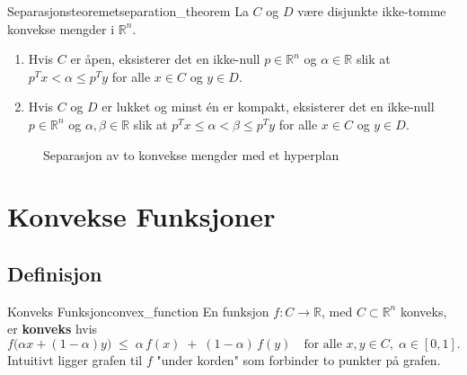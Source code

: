 \begin{theorem}{Separasjonsteoremet}{separation_theorem}
    La $C$ og $D$ være disjunkte ikke-tomme konvekse mengder i $\mathbb{R}^n$.
    \begin{enumerate}
        \item Hvis $C$ er åpen, eksisterer det en ikke-null $p \in \mathbb{R}^n$ og $\alpha \in \mathbb{R}$ slik at $p^T x < \alpha \leq p^T y$ for alle $x \in C$ og $y \in D$.
        \item Hvis $C$ og $D$ er lukket og minst én er kompakt, eksisterer det en ikke-null $p \in \mathbb{R}^n$ og $\alpha, \beta \in \mathbb{R}$ slik at $p^T x \leq \alpha < \beta \leq p^T y$ for alle $x \in C$ og $y \in D$.
    \end{enumerate}
\end{theorem}

\begin{figure}[htb]
    \centering
    \caption{Separasjon av to konvekse mengder med et hyperplan}
    \label{fig:separation}
\end{figure}

\section{Konvekse Funksjoner}

\subsection{Definisjon}
\begin{definition}{Konveks Funksjon}{convex_function}
    En funksjon $f: C \to \mathbb{R}$, med $C \subset \mathbb{R}^n$ konveks, er \textbf{konveks} hvis
    \[
    f\bigl(\alpha x + (1-\alpha) y \bigr) \;\le\; \alpha\, f(x) \;+\;(1-\alpha)\, f(y)\quad \text{for alle }x,y \in C,\;\alpha \in [0, 1].
    \]
    Intuitivt ligger grafen til $f$ "under korden" som forbinder to punkter på grafen.
\end{definition}

